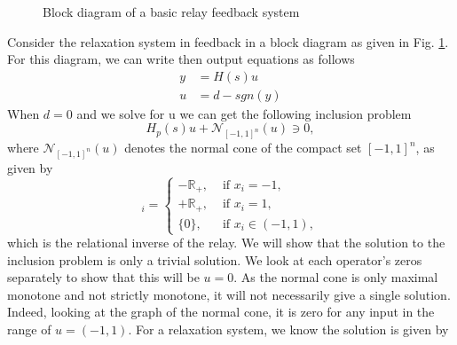 \begin{figure}[h]
    \centering
{}
    \caption{Block diagram of a basic relay feedback system}
    \label{fig: RFS}
\end{figure}
Consider the relaxation system in feedback in a block diagram as given in Fig. \ref{fig: RFS}. For this diagram, we can write then output equations as follows
\begin{equation}
    \begin{split}
            y &= H(s)u \\
            u &= d-sgn(y)
    \end{split}
\end{equation}
When $d = 0$ and we solve for u we can get the following inclusion problem
\begin{equation}
    H_p(s)u + \mathcal{N}_{[-1,1]^n}(u) \ni 0,
    \label{eq: monotoneonly}
\end{equation}
where  $\mathcal{N}_{[-1,1]^n}(u)$ denotes the normal cone of the compact set $[-1,1]^n$, as given by
\begin{equation}
    [\mathcal{N}_{[-1,1]^n}(x)]_i = \begin{cases}
        -\mathbb{R}_+, & \text{ if } x_i=-1,\\
        +\mathbb{R}_+, & \text{ if } x_i=1, \\
        \{0\}, &\text{ if } x_i\in (-1, 1),
    \end{cases}
\end{equation}
which is the relational inverse of the relay. We will show that the solution to the inclusion problem is only a trivial solution. We look at each operator's zeros separately to show that this will be $u = 0$. As the normal cone is only maximal monotone and not strictly monotone, it will not necessarily give a single solution. Indeed, looking at the graph of the normal cone, it is zero for any input in the range of $u = (-1, 1)$. For a relaxation system, we know the solution is given by
